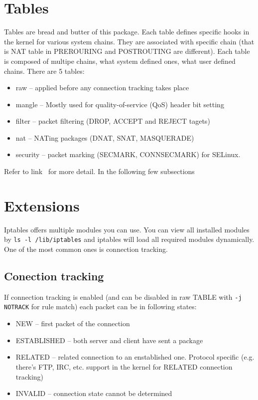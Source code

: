 \documentclass[times, utf8, seminar, english]{fer}
\begin{document}
\section{Tables}
    Tables are bread and butter of this package. Each table defines specific hooks in the kernel for various system chains. They are associated with specific chain (that is NAT table in PREROURING and POSTROUTING are different). Each table is composed of multipe chains, what system defined ones, what user defined chains.
    There are 5 tables:
    \begin{itemize}
        \item raw -- applied before any connection tracking takes place
        \item mangle -- Mostly used for quality-of-service (QoS) header bit setting
        \item filter -- packet filtering (DROP, ACCEPT and REJECT tagets)
        \item nat -- NATing packages (DNAT, SNAT, MASQUERADE)
        \item security -- packet marking (SECMARK, CONNSECMARK) for SELinux.
    \end{itemize}
    Refer to link~\cite{Iptables27:online} for more detail. In the following few subsections

\section{Extensions}
    Iptables offers multiple modules you can use.
    You can view all installed modules by \texttt{ls -l /lib/iptables} and iptables will load all required modules dynamically. One of the most common ones is connection tracking.

    \subsection{Conection tracking}
    If connection tracking is enabled (and can be disabled in raw TABLE with \texttt{-j NOTRACK} for rule match) each packet can be in following states:
    \begin{itemize}
        \item NEW -- first packet of the connection
        \item ESTABLISHED -- both server and client have sent a package
        \item RELATED -- related connection to an enstablished one. Protocol specific (e.g. there's FTP, IRC, etc. support in the kernel for RELATED connection tracking)
        \item INVALID -- connection state cannot be determined
    \end{itemize}
\end{document}
